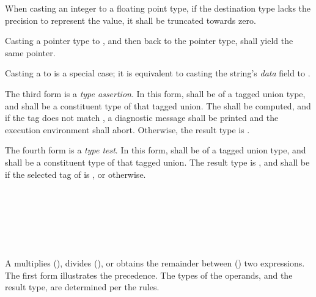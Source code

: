 \specsubsubitem
When casting an integer to a floating point type, if the destination type
lacks the precision to represent the value, it shall be truncated towards zero.

\specsubsubitem
Casting a pointer type to , and then back to the pointer
type, shall yield the same pointer.


\specsubsubitem
Casting a  to \terminal{*}  is a special case; it
is equivalent to casting the string's \textit{data} field to \terminal{*}
.

\specsubsubitem
The third form is a \textit{type assertion}. In this form,
 shall be of a tagged union type, and
 shall be a constituent type of that tagged union. The
 shall be computed, and if the tag does not match
, a diagnostic message shall be printed and the execution
environment shall abort. Otherwise, the result type is .

\specsubsubitem
The fourth form is a \textit{type test}. In this form,
 shall be of a tagged union type, and
 shall be a constituent type of that tagged union. The result
type is , and shall be  if the selected tag of
 is , or 
otherwise.


\begin{grammar}
 \\
	 \\
	 \terminal{*}  \\
	 \terminal{/}  \\
	 \terminal{\%}  \\
\end{grammar}

\specsubsubitem
A  multiplies (\terminal{*}), divides
(\terminal{/}), or obtains the remainder between (\terminal{\%}) two
expressions. The first form illustrates the precedence. The types of the
operands, and the result type, are determined per the 
rules.

